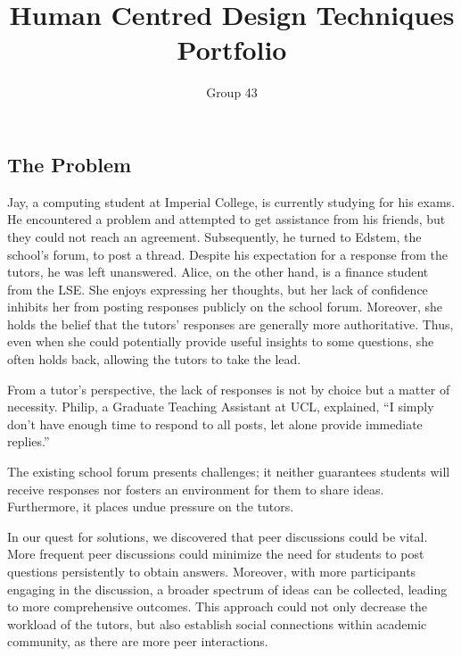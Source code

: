 \documentclass[a4paper]{article}
\begin{document}
    \title{
        \vspace{-3em}
        Human Centred Design Techniques Portfolio}
    \author{
        Group 43
    }
    \date{\vspace{-2em}}
    \maketitle

    \subsection*{The Problem}

    Jay, a computing student at Imperial College, is currently studying for his exams.
    He encountered a problem and attempted to get assistance from his friends, but they could not reach an agreement.
    Subsequently, he turned to Edstem, the school’s forum, to post a thread.
    Despite his expectation for a response from the tutors, he was left unanswered.
    Alice, on the other hand, is a finance student from the LSE. She enjoys expressing her thoughts, but her lack of confidence inhibits her from posting responses publicly on the school forum.
    Moreover, she holds the belief that the tutors' responses are generally more authoritative.
    Thus, even when she could potentially provide useful insights to some questions, she often holds back, allowing the tutors to take the lead.

    From a tutor's perspective, the lack of responses is not by choice but a matter of necessity.
    Philip, a Graduate Teaching Assistant at UCL, explained, ``I simply don't have enough time to respond to all posts, let alone provide immediate replies.''

    The existing school forum presents challenges; it neither guarantees students will receive responses nor fosters an environment for them to share ideas.
    Furthermore, it places undue pressure on the tutors.

    In our quest for solutions, we discovered that peer discussions could be vital.
    More frequent peer discussions could minimize the need for students to post questions persistently to obtain answers.
    Moreover, with more participants engaging in the discussion, a broader spectrum of ideas can be collected, leading to more comprehensive outcomes.
    This approach could not only decrease the workload of the tutors, but also establish social connections within academic community, as there are more peer interactions.
\end{document}
